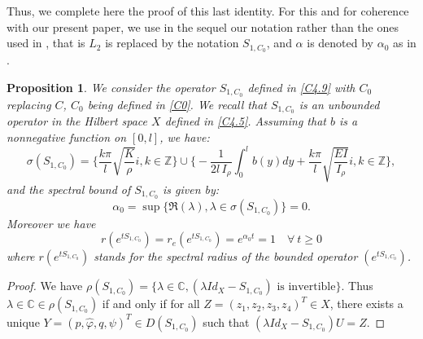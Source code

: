 \documentclass[10pt, english]{article}
\newtheorem{prop}[thm]{Proposition}
\begin{document}
{Thus, we complete here the proof of this last identity. For this and for coherence with our present paper, we use in the sequel our notation rather than the ones used in \cite{SW2003}, that is
$L_2$ is replaced by the notation $S_{1,C_0}$, and $\alpha$ is denoted by $\alpha_0$ as in \cite{NRL1986}.

\begin{prop}\label{spectrumS1}
We consider the operator $S_{1,C_0}$ defined in \eqref{C4.9} with $C_0$ replacing $C$, $C_0$ being defined in \eqref{C0}. We recall that $S_{1,C_0}$ is an unbounded operator in the Hilbert space $X$ defined in \eqref{C4.5}. Assuming that $b$ is a nonnegative function on $[0,l]$, we have:
\begin{equation}\label{Cb4.52}%
\sigma(S_{1,C_0})=\Big\{\dfrac{k\pi }{l} \sqrt{\dfrac{K}{\rho}} i, k \in \mathbb{Z}\Big\} \cup \Big\{- \dfrac{1}{2l \,I_{\rho}} \int_0^l b(y)dy +  \dfrac{k\pi }{l} \sqrt{\dfrac{E I }{I_{\rho}}} i, k \in \mathbb{Z}\Big\},
\end{equation}
and the spectral bound of $S_{1,C_0}$ is given by:
\begin{equation}\label{C4.53}
\alpha_0=\sup\{\Re(\lambda), \lambda \in \sigma(S_{1,C_0})\}=0. 
\end{equation}
Moreover we have
\begin{equation}\label{C4.53b}
r(e^{tS_{1,C_0}})=r_e(e^{tS_{1,C_0}})=e^{\alpha_0 t}=1 \quad \forall \ t \geqslant 0
\end{equation}
where $r(e^{tS_{1,C_0}})$ stands for the spectral radius of the bounded operator $(e^{tS_{1,C_0}})$.
\end{prop}
\begin{proof}
We have $\rho(S_{1,C_0})=\{ \lambda \in \mathbb{C}, (\lambda Id_X - S_{1,C_0}) \mbox{ is invertible}\}$. Thus $\lambda \in \mathbb{C} \in \rho(S_{1,C_0})$ if and only if for all $Z=(z_1,z_2, z_3, z_4)^T \in X$, there exists a unique $Y=(p,\widehat{\varphi}, q, \psi)^T \in D(S_{1,C_0})$ such that $(\lambda Id_X - S_{1,C_0})U=Z$. 


\end{proof}}
\end{document}

